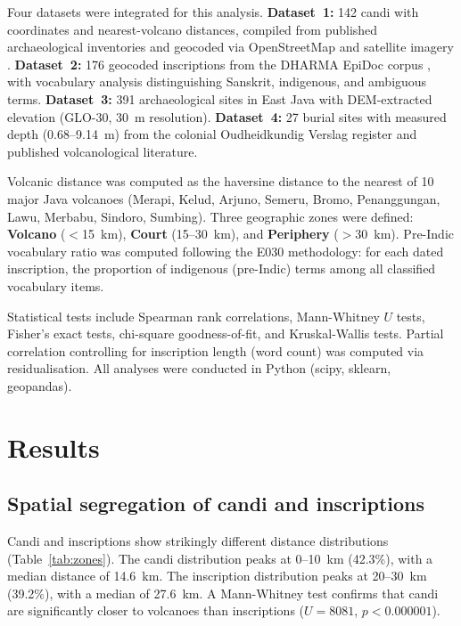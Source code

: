 \documentclass[12pt]{article}
\begin{document}
Four datasets were integrated for this analysis.
\textbf{Dataset~1:} 142 candi with coordinates and nearest-volcano distances, compiled from published archaeological inventories and geocoded via OpenStreetMap and satellite imagery \citep{Degroot2009}.
\textbf{Dataset~2:} 176 geocoded inscriptions from the DHARMA EpiDoc corpus \citep{DHARMA2024}, with vocabulary analysis distinguishing Sanskrit, indigenous, and ambiguous terms.
\textbf{Dataset~3:} 391 archaeological sites in East Java with DEM-extracted elevation (GLO-30, 30~m resolution).
\textbf{Dataset~4:} 27 burial sites with measured depth (0.68--9.14~m) from the colonial Oudheidkundig Verslag register and published volcanological literature.

Volcanic distance was computed as the haversine distance to the nearest of 10 major Java volcanoes (Merapi, Kelud, Arjuno, Semeru, Bromo, Penanggungan, Lawu, Merbabu, Sindoro, Sumbing).
Three geographic zones were defined: \textbf{Volcano} ($<$15~km), \textbf{Court} (15--30~km), and \textbf{Periphery} ($>$30~km).
Pre-Indic vocabulary ratio was computed following the E030 methodology: for each dated inscription, the proportion of indigenous (pre-Indic) terms among all classified vocabulary items.

Statistical tests include Spearman rank correlations, Mann-Whitney $U$ tests, Fisher's exact tests, chi-square goodness-of-fit, and Kruskal-Wallis tests.
Partial correlation controlling for inscription length (word count) was computed via residualisation.
All analyses were conducted in Python (scipy, sklearn, geopandas).


\section{Results}

\subsection{Spatial segregation of candi and inscriptions}

Candi and inscriptions show strikingly different distance distributions (Table~\ref{tab:zones}).
The candi distribution peaks at 0--10~km (42.3\%), with a median distance of 14.6~km.
The inscription distribution peaks at 20--30~km (39.2\%), with a median of 27.6~km.
A Mann-Whitney test confirms that candi are significantly closer to volcanoes than inscriptions ($U = 8081$, $p < 0.000001$).
\end{document}
